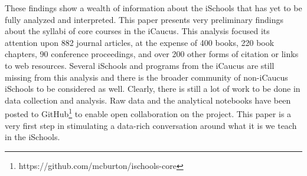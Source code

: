 \documentclass[10pt, letterpaper]{article}
\begin{document}
These findings show a wealth of information about the iSchools that has yet to be fully analyzed and interpreted. This paper presents very preliminary findings about the syllabi of core courses in the iCaucus. This analysis focused its attention upon 882 journal articles, at the expense of 400 books, 220 book chapters, 90 conference proceedings, and over 200 other forms of citation or links to web resources. Several iSchools and programs from the iCaucus are still missing from this analysis and there is the broader community of non-iCaucus iSchools to be considered as well. Clearly, there is still a lot of work to be done in data collection and analysis. Raw data and the analytical notebooks have been posted to GitHub\footnote{https://github.com/mcburton/ischools-core} to enable open collaboration on the project. This paper is a very first step in stimulating a data-rich conversation around what it is we teach in the iSchools.

\fontsize{10pt}{10pt}\selectfont
{} %

\end{document}
